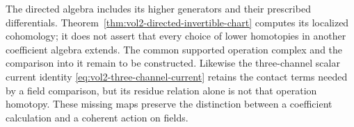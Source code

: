 The directed algebra includes its higher generators and
their prescribed differentials. Theorem~\ref{thm:vol2-directed-invertible-chart}
computes its localized cohomology; it does not assert that
every choice of lower homotopies in another coefficient
algebra extends. The common supported operation complex and
the comparison into it remain to be constructed. Likewise
the three-channel scalar
current identity \eqref{eq:vol2-three-channel-current}
retains the contact terms needed by a field comparison,
but its residue relation alone is not that operation
homotopy. These missing maps preserve the distinction
between a coefficient calculation and a coherent action
on fields.
